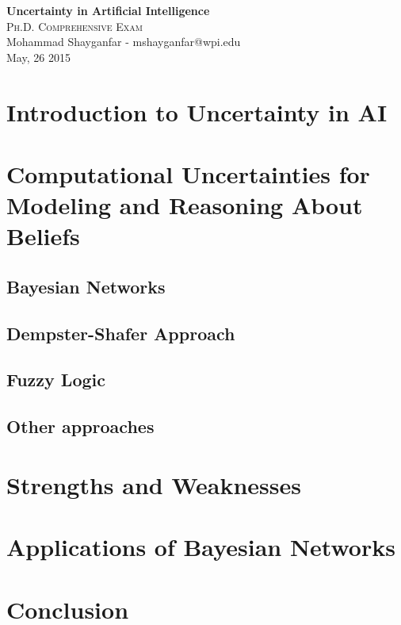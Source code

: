 \documentclass[11pt]{article}
\begin{document}

\begin{center}
{\LARGE{\textbf{Uncertainty in Artificial Intelligence}}} \\
\Large\textsc{Ph.D. Comprehensive Exam} \\[1em]
\large\textnormal{Mohammad Shayganfar - mshayganfar@wpi.edu} \\
\large\textnormal{May, 26 2015}
\end{center}

\section{Introduction to Uncertainty in AI}

\section{Computational Uncertainties for Modeling and Reasoning About Beliefs}

\subsection{Bayesian Networks}

\subsection{Dempster-Shafer Approach}

\subsection{Fuzzy Logic}

\subsection{Other approaches}

\section{Strengths and Weaknesses}

\section{Applications of Bayesian Networks}

\section{Conclusion}



\end{document}
